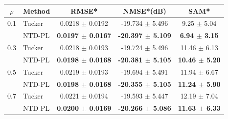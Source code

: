 \begin{tabular}{@{}c l c c c@{}}
    \toprule
    $\rho$ & Method & RMSE* & NMSE*(dB) & SAM* \\
    \midrule
    0.1 & Tucker & 0.0218 $\pm$ 0.0192 & -19.734 $\pm$ 5.496 & 9.25 $\pm$ 5.04 \\
     & NTD-PL & \textbf{0.0197 $\pm$ 0.0167} & \textbf{-20.397 $\pm$ 5.109} & \textbf{6.94 $\pm$ 3.15} \\
    \midrule
    0.3 & Tucker & 0.0218 $\pm$ 0.0193 & -19.724 $\pm$ 5.496 & 11.46 $\pm$ 6.13 \\
     & NTD-PL & \textbf{0.0198 $\pm$ 0.0168} & \textbf{-20.381 $\pm$ 5.105} & \textbf{10.46 $\pm$ 5.20} \\
    \midrule
    0.5 & Tucker & 0.0219 $\pm$ 0.0193 & -19.694 $\pm$ 5.491 & 11.94 $\pm$ 6.67 \\
     & NTD-PL & \textbf{0.0198 $\pm$ 0.0168} & \textbf{-20.355 $\pm$ 5.105} & \textbf{11.24 $\pm$ 5.90} \\
    \midrule
    0.7 & Tucker & 0.0221 $\pm$ 0.0194 & -19.593 $\pm$ 5.447 & 12.19 $\pm$ 7.04 \\
     & NTD-PL & \textbf{0.0200 $\pm$ 0.0169} & \textbf{-20.266 $\pm$ 5.086} & \textbf{11.63 $\pm$ 6.33} \\
    \bottomrule
\end{tabular}
